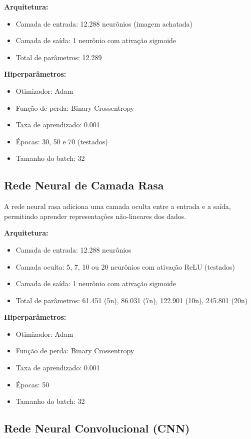 \documentclass[a4paper,12pt]{article}
\begin{document}
\textbf{Arquitetura:}
\begin{itemize}
    \item Camada de entrada: 12.288 neurônios (imagem achatada)
    \item Camada de saída: 1 neurônio com ativação sigmoide
    \item Total de parâmetros: 12.289
\end{itemize}

\textbf{Hiperparâmetros:}
\begin{itemize}
    \item Otimizador: Adam
    \item Função de perda: Binary Crossentropy
    \item Taxa de aprendizado: 0.001
    \item Épocas: 30, 50 e 70 (testados)
    \item Tamanho do batch: 32
\end{itemize}

\subsection{Rede Neural de Camada Rasa}
\label{subsec:rasa}

A rede neural rasa adiciona uma camada oculta entre a entrada e a saída, permitindo aprender representações não-lineares dos dados.

\textbf{Arquitetura:}
\begin{itemize}
    \item Camada de entrada: 12.288 neurônios
    \item Camada oculta: 5, 7, 10 ou 20 neurônios com ativação ReLU (testados)
    \item Camada de saída: 1 neurônio com ativação sigmoide
    \item Total de parâmetros: 61.451 (5n), 86.031 (7n), 122.901 (10n), 245.801 (20n)
\end{itemize}

\textbf{Hiperparâmetros:}
\begin{itemize}
    \item Otimizador: Adam
    \item Função de perda: Binary Crossentropy
    \item Taxa de aprendizado: 0.001
    \item Épocas: 50
    \item Tamanho do batch: 32
\end{itemize}

\subsection{Rede Neural Convolucional (CNN)}
\label{subsec:cnn}
\end{document}
